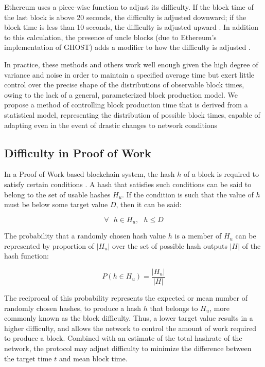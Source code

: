 \documentclass[]{article}
\begin{document}
Ethereum uses a piece-wise function to adjust its difficulty.  If the block time of the last block is above 20 seconds, the difficulty is adjusted downward; if the block time is less than 10 seconds, the difficulty is adjusted upward \cite{EthereumDifficulty}.  In addition to this calculation, the presence of uncle blocks (due to Ethereum's implementation of GHOST) adds a modifier to how the difficulty is adjusted \cite{EthereumUncles}.
\newline

In practice, these methods and others work well enough given the high degree of variance and noise in order to maintain a specified average time but exert little control over the precise shape of the distributions of observable block times, owing to the lack of a general, parameterized block production model.  We propose a method of controlling block production time that is derived from a statistical model, representing the distribution of possible block times, capable of adapting even in the event of drastic changes to network conditions

\subsection{Difficulty in Proof of Work}
In a Proof of Work based blockchain system, the hash $h$ of a block is required to satisfy certain conditions \cite{BitcoinWhitepaper}.  A hash that satisfies such conditions can be said to belong to the set of usable hashes $H_u$.  If the condition is such that the value of $h$ must be below some target value $D$, then it can be said:

\begin{equation}
\forall \text{ } h \in H_u, \text{ } h \le D
\end{equation}

The probability that a randomly chosen hash value $h$ is a member of $H_u$ can be represented by proportion of $|H_u|$ over the set of possible hash outputs $|H|$ of the hash function: 

\begin{equation}
	P(h \in H_u) = \frac{|H_u|}{|H|} 
\end{equation}

The reciprocal of this probability represents the expected or mean number of randomly chosen hashes, to produce a hash $h$ that belongs to $H_u$, more commonly known as the block difficulty.  Thus, a lower target value results in a higher difficulty, and allows the network to control the amount of work required to produce a block.  Combined with an estimate of the total hashrate of the network, the protocol may adjust difficulty to minimize the difference between the target time $t$ and mean block time.  
\end{document}
